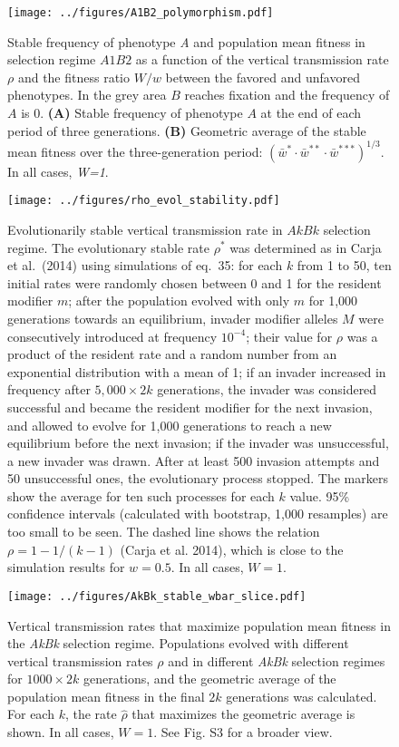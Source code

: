 \documentclass[]{article}
\begin{document}
\begin{figure}
\centering
\texttt{[image: ../figures/A1B2\_polymorphism.pdf]}
\caption{Stable frequency of phenotype \emph{A} and population mean fitness in selection regime
$A1B2$ as a function of the vertical transmission rate \(\rho\) and the fitness ratio \(W/w\) between the favored and unfavored phenotypes.
In the grey area \(B\) reaches fixation and the frequency of \(A\) is 0.
\textbf{(A)} Stable frequency of phenotype $A$ at the end of each period of three generations.
\textbf{(B)} Geometric average of the stable mean fitness over the three-generation period: $(\bar{w}^* \cdot \bar{w}^{**} \cdot \bar{w}^{***})^{1/3}$.
In all cases, \emph{W=1}.}\label{fig:A1B2_polymorphism}
\end{figure}

\begin{figure}
\centering
\texttt{[image: ../figures/rho\_evol\_stability.pdf]}
\caption{Evolutionarily stable vertical transmission rate in $AkBk$ selection regime. 
The evolutionary stable rate $\rho^*$ was determined as in Carja et al.\ (2014) using simulations of eq.\ 35: for each $k$ from 1 to 50, ten initial rates were randomly chosen between 0 and 1 for the resident modifier $m$; after the population evolved with only $m$ for 1,000 generations towards an equilibrium, invader modifier alleles $M$ were consecutively introduced at frequency $10^{-4}$; their value for $\rho$ was a product of the resident rate and a random number from an exponential distribution with a mean of 1; if an invader increased in frequency after $5,000 \times 2k$ generations, the invader was considered successful and became the resident modifier for the next invasion, and allowed to evolve for 1,000 generations to reach a new equilibrium before the next invasion; if the invader was unsuccessful, a new invader was drawn. After at least 500 invasion attempts and 50 unsuccessful ones, the evolutionary process stopped. The markers show the average for ten such processes for each $k$ value. 95\% confidence intervals (calculated with bootstrap, 1,000 resamples) are too small to be seen. The dashed line shows the relation $\rho=1-1/(k-1)$ (Carja et al. 2014), which is close to the simulation results for \(w=0.5\).
In all cases, $W=1$.}\label{fig:rho_evol_stability}
\end{figure}

\begin{figure}
\centering
\texttt{[image: ../figures/AkBk\_stable\_wbar\_slice.pdf]}
\caption{Vertical transmission rates that maximize population mean fitness in the \emph{AkBk} selection regime.
Populations evolved with different vertical transmission rates \(\rho\) and in different \emph{AkBk} selection regimes for \(1000 \times 2k\) generations, and the geometric average of the population mean fitness in the final \(2k\) generations was calculated.
For each \(k\), the rate \(\hat{\rho}\) that maximizes the geometric average is shown.
In all cases, $W=1$. See Fig. S3 for a broader view.} \label{AkBk_stable_wbar_slice}
\end{figure}
 
\end{document}
